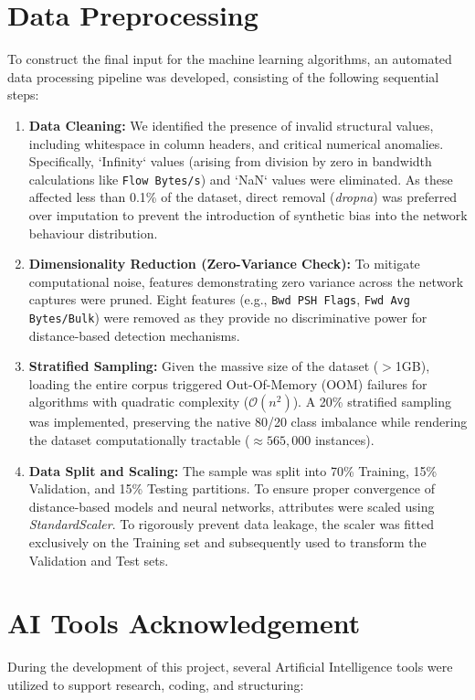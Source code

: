 \section{Data Preprocessing}

To construct the final input for the machine learning algorithms, an automated data processing pipeline was developed, consisting of the following sequential steps:

\begin{enumerate}
    \item \textbf{Data Cleaning:} We identified the presence of invalid structural values, including whitespace in column headers, and critical numerical anomalies. Specifically, `Infinity` values (arising from division by zero in bandwidth calculations like \texttt{Flow Bytes/s}) and `NaN` values were eliminated. As these affected less than 0.1\% of the dataset, direct removal (\textit{dropna}) was preferred over imputation to prevent the introduction of synthetic bias into the network behaviour distribution.
    \item \textbf{Dimensionality Reduction (Zero-Variance Check):} To mitigate computational noise, features demonstrating zero variance across the network captures were pruned. Eight features (e.g., \texttt{Bwd PSH Flags}, \texttt{Fwd Avg Bytes/Bulk}) were removed as they provide no discriminative power for distance-based detection mechanisms.
    \item \textbf{Stratified Sampling:} Given the massive size of the dataset ($>$1GB), loading the entire corpus triggered Out-Of-Memory (OOM) failures for algorithms with quadratic complexity ($\mathcal{O}(n^2)$). A 20\% stratified sampling was implemented, preserving the native 80/20 class imbalance while rendering the dataset computationally tractable ($\approx 565,000$ instances).
    \item \textbf{Data Split and Scaling:} The sample was split into 70\% Training, 15\% Validation, and 15\% Testing partitions. To ensure proper convergence of distance-based models and neural networks, attributes were scaled using \textit{StandardScaler}. To rigorously prevent data leakage, the scaler was fitted exclusively on the Training set and subsequently used to transform the Validation and Test sets.
\end{enumerate}

\section{AI Tools Acknowledgement}
During the development of this project, several Artificial Intelligence tools were utilized to support research, coding, and structuring:

